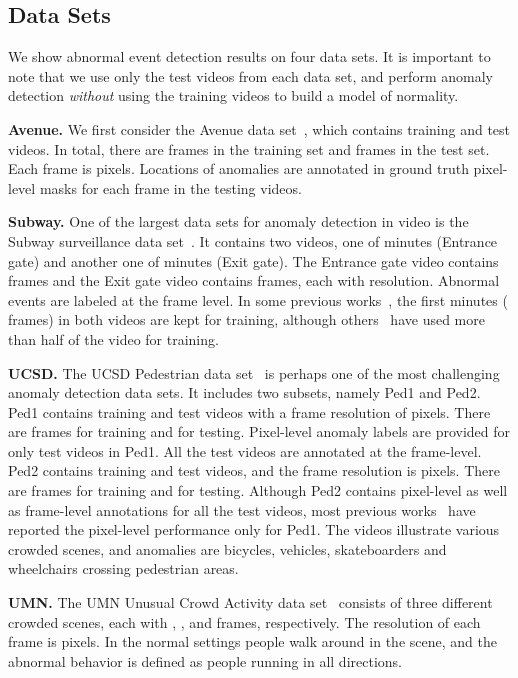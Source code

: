 \documentclass[10pt,twocolumn,letterpaper]{article}
\begin{document}
\vspace*{-0.1cm}
\subsection{Data Sets}

We show abnormal event detection results on four data sets. It is important to note that we use only the test videos from each data set, and perform anomaly detection \emph{without} using the training videos to build a model of normality.

\noindent
{\bf Avenue.}
We first consider the Avenue data set~\cite{Lu-ICCV-2013}, which contains  training and  test videos. In total, there are  frames in the training set and  frames in the test set. Each frame is  pixels. Locations of anomalies are annotated in ground truth pixel-level masks for each frame in the testing videos.

\noindent
{\bf Subway.}
One of the largest data sets for anomaly detection in video is the Subway surveillance data set~\cite{Adam-PAMI-2008}. It contains two videos, one of  minutes (Entrance gate) and another one of  minutes (Exit gate). The Entrance gate video contains  frames and the Exit gate video contains  frames, each with  resolution. Abnormal events are labeled at the frame level. In some previous works~\cite{Lu-ICCV-2013,Zhang-PR-2016}, the first  minutes ( frames) in both videos are kept for training, although others~\cite{Cheng-CVPR-2015} have used more than half of the video for training.

\noindent
{\bf UCSD.}
The UCSD Pedestrian data set~\cite{Mahadevan-CVPR-2010} is perhaps one of the most challenging anomaly detection data sets. It includes two subsets, namely Ped1 and Ped2. Ped1 contains  training and  test videos with a frame resolution of  pixels. There are  frames for training and  for testing. Pixel-level anomaly labels are provided for only  test videos in Ped1. All the  test videos are annotated at the frame-level. Ped2 contains  training and  test videos, and the frame resolution is  pixels. There are  frames for training and  for testing. Although Ped2 contains pixel-level as well as frame-level annotations for all the test videos, most previous works~\cite{Cong-CVPR-2011,Lu-ICCV-2013,Ren-BMVC-2015,Xu-BMVC-2015,Zhang-PR-2016} have reported the pixel-level performance only for Ped1. The videos illustrate various crowded scenes, and anomalies are bicycles, vehicles, skateboarders and wheelchairs crossing pedestrian areas.

\noindent
{\bf UMN.}
The UMN Unusual Crowd Activity data set~\cite{Mehran-CVPR-2009} consists of three different crowded scenes, each with , , and  frames, respectively. The resolution of each frame is  pixels. In the normal settings people walk around in the scene, and the abnormal behavior is defined as people running in all directions.
\end{document}
